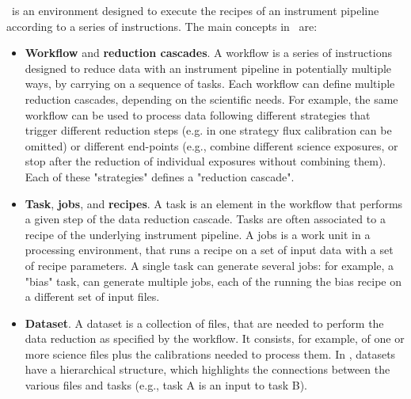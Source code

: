 
\edps\ is an environment designed to execute the recipes of an instrument pipeline according to a series of instructions. 
The main concepts in \edps\ are:

\begin{itemize}
  
\item \textbf{Workflow} and \textbf{reduction cascades}. A workflow is
  a series of instructions designed to reduce data with an instrument
  pipeline in potentially multiple ways, by carrying on a sequence of
  tasks.  Each workflow can define multiple reduction cascades,
  depending on the scientific needs.  For example, the same workflow
  can be used to process data following different strategies that
  trigger different reduction steps (e.g. in one strategy flux
  calibration can be omitted) or different end-points (e.g., combine
  different science exposures, or stop after the reduction of
  individual exposures without combining them). Each of these
  "strategies" defines a "reduction cascade".


\item \textbf{Task}, \textbf{jobs}, and \textbf{recipes}. A task is an
  element in the workflow that performs a given step of the data
  reduction cascade. Tasks are often associated to a recipe of the
  underlying instrument pipeline.  A jobs is a work unit in a
  processing environment, that runs a recipe on a set of input data
  with a set of recipe parameters.  A single task can generate several
  jobs: for example, a "bias" task, can generate multiple jobs, each
  of the running the bias recipe on a different set of input files.


\item \textbf{Dataset}. A dataset is a collection of files, that are
  needed to perform the data reduction as specified by the
  workflow. It consists, for example, of one or more science files
  plus the calibrations needed to process them. In \edps,  datasets
  have a hierarchical structure, which highlights the connections
  between the various files and tasks (e.g., task A is an input to
  task B).



\end{itemize}
